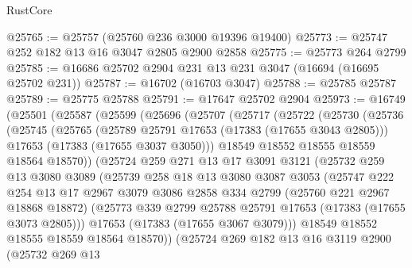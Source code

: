 \begin{lexlean}{RustCore}
\begin{coremodule}
@25765 := @25757 (@25760 @236 @3000 @19396 @19400)
@25773 := @25747 @252 @182 @13 @16 @3047 @2805 @2900 @2858
@25775 := @25773 @264 @2799
@25785 := @16686 @25702 @2904 @231 @13 @231 @3047 (@16694 (@16695 @25702 @231))
@25787 := @16702 (@16703 @3047)
@25788 := @25785 @25787
@25789 := @25775 @25788
@25791 := @17647 @25702 @2904
@25973 := @16749
    (@25501
      (@25587
        (@25599
          (@25696
            (@25707
              (@25717
                (@25722
                  (@25730
                    (@25736
                      (@25745
                        (@25765
                          (@25789 @25791 @17653 (@17383 (@17655 @3043 @2805)))
                          @17653
                          (@17383 (@17655 @3037 @3050)))
                        @18549
                        @18552
                        @18555
                        @18559
                        @18564
                        @18570))
                    (@25724
                      @259
                      @271
                      @13
                      @17
                      @3091
                      @3121
                      (@25732
                        @259
                        @13
                        @3080
                        @3089
                        (@25739
                          @258
                          @18
                          @13
                          @3080
                          @3087
                          @3053
                          (@25747
                            @222
                            @254
                            @13
                            @17
                            @2967
                            @3079
                            @3086
                            @2858
                            @334
                            @2799
                            (@25760 @221 @2967 @18868 @18872)
                            (@25773 @339 @2799 @25788 @25791 @17653 (@17383 (@17655 @3073 @2805)))
                            @17653
                            (@17383 (@17655 @3067 @3079)))
                          @18549
                          @18552
                          @18555
                          @18559
                          @18564
                          @18570))
                      (@25724
                        @269
                        @182
                        @13
                        @16
                        @3119
                        @2900
                        (@25732
                          @269
                          @13

\end{coremodule}
\end{lexlean}
